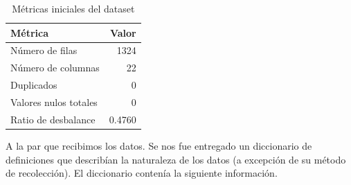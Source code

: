 \documentclass[12pt, letterpaper]{article}
\begin{document}
\begin{table}[H]
\centering
\caption{Métricas iniciales del dataset}
\begin{tabular}{|l|r|}
\hline
\textbf{Métrica} & \textbf{Valor} \\ \hline
Número de filas & 1324 \\ \hline
Número de columnas & 22 \\ \hline
Duplicados & 0 \\ \hline
Valores nulos totales & 0 \\ \hline
Ratio de desbalance & 0.4760 \\ \hline
\end{tabular}
\end{table}

A la par que recibimos los datos. Se nos fue entregado un diccionario de definiciones que describían la naturaleza de los datos (a excepción de su método de recolección). El diccionario contenía la siguiente información.
\end{document}
